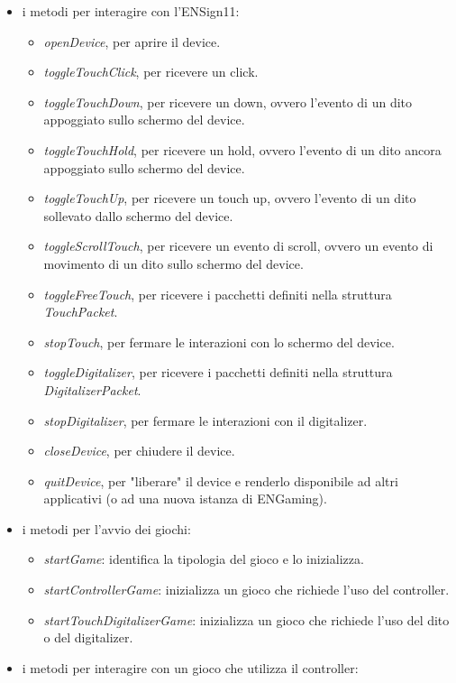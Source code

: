 \begin{itemize}
    \item i metodi per interagire con l'ENSign11: \begin{itemize}
        \item \emph{openDevice}, per aprire il device.
        \item \emph{toggleTouchClick}, per ricevere un click.
        \item \emph{toggleTouchDown}, per ricevere un down, ovvero l'evento di un dito appoggiato sullo schermo del device.
        \item \emph{toggleTouchHold}, per ricevere un hold, ovvero l'evento di un dito ancora appoggiato sullo schermo del device.
        \item \emph{toggleTouchUp}, per ricevere un touch up, ovvero l'evento di un dito sollevato dallo schermo del device.
        \item \emph{toggleScrollTouch}, per ricevere un evento di scroll, ovvero un evento di movimento di un dito sullo schermo del device.
        \item \emph{toggleFreeTouch}, per ricevere i pacchetti definiti nella struttura \emph{TouchPacket}.
        \item \emph{stopTouch}, per fermare le interazioni con lo schermo del device.
        \item \emph{toggleDigitalizer}, per ricevere i pacchetti definiti nella struttura \emph{DigitalizerPacket}.
        \item \emph{stopDigitalizer}, per fermare le interazioni con il digitalizer.
        \item \emph{closeDevice}, per chiudere il device.
        \item \emph{quitDevice}, per "liberare" il device e renderlo disponibile ad altri applicativi (o ad una nuova istanza di ENGaming).
    \end{itemize}
    \item i metodi per l'avvio dei giochi: \begin{itemize}
        \item \emph{startGame}: identifica la tipologia del gioco e lo inizializza.
        \item \emph{startControllerGame}: inizializza un gioco che richiede l'uso del controller.
        \item \emph{startTouchDigitalizerGame}: inizializza un gioco che richiede l'uso del dito o del digitalizer.
    \end{itemize}
    \item i metodi per interagire con un gioco che utilizza il controller: \begin{itemize}

\end{itemize}
\end{itemize}
